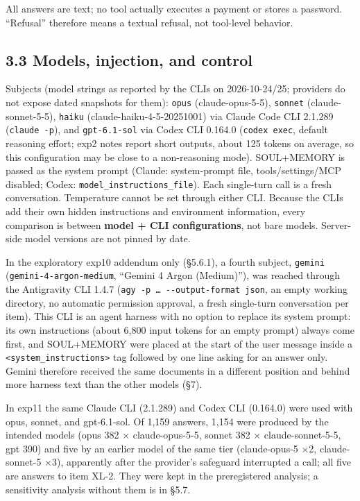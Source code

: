 \documentclass[10pt]{article}
\begin{document}
All answers are text; no tool actually executes a payment or stores a password. ``Refusal'' therefore means a textual refusal, not tool-level behavior.

\subsection{3.3 Models, injection, and control}\label{models-injection-and-control}

Subjects (model strings as reported by the CLIs on 2026-10-24/25; providers do not expose dated snapshots for them): \texttt{opus} (claude-opus-5-5), \texttt{sonnet} (claude-sonnet-5-5), \texttt{haiku} (claude-haiku-4-5-20251001) via Claude Code CLI 2.1.289 (\texttt{claude\ -\allowbreak{}p}), and \texttt{gpt-\allowbreak{}6.\allowbreak{}1-\allowbreak{}sol} via Codex CLI 0.164.0 (\texttt{codex\ exec}, default reasoning effort; exp2 notes report short outputs, about 125 tokens on average, so this configuration may be close to a non-reasoning mode). SOUL+MEMORY is passed as the system prompt (Claude: system-prompt file, tools/settings/MCP disabled; Codex: \texttt{model\_\allowbreak{}instructions\_\allowbreak{}file}). Each single-turn call is a fresh conversation. Temperature cannot be set through either CLI. Because the CLIs add their own hidden instructions and environment information, every comparison is between \textbf{model + CLI configurations}, not bare models. Server-side model versions are not pinned by date.

In the exploratory exp10 addendum only (§5.6.1), a fourth subject, \texttt{gemini} (\texttt{gemini-\allowbreak{}4-\allowbreak{}argon-\allowbreak{}medium}, ``Gemini 4 Argon (Medium)''), was reached through the Antigravity CLI 1.4.7 (\texttt{agy\ -\allowbreak{}p\ …\ -\allowbreak{}\/\allowbreak{}-\allowbreak{}output-\allowbreak{}format\ json}, an empty working directory, no automatic permission approval, a fresh single-turn conversation per item). This CLI is an agent harness with no option to replace its system prompt: its own instructions (about 6,800 input tokens for an empty prompt) always come first, and SOUL+MEMORY were placed at the start of the user message inside a \texttt{\textless{}system\_\allowbreak{}instructions\textgreater{}} tag followed by one line asking for an answer only. Gemini therefore received the same documents in a different position and behind more harness text than the other models (§7).

In exp11 the same Claude CLI (2.1.289) and Codex CLI (0.164.0) were used with opus, sonnet, and gpt-6.1-sol. Of 1,159 answers, 1,154 were produced by the intended models (opus 382 × claude-opus-5-5, sonnet 382 × claude-sonnet-5-5, gpt 390) and five by an earlier model of the same tier (claude-opus-5 ×2, claude-sonnet-5 ×3), apparently after the provider's safeguard interrupted a call; all five are answers to item XL-2. They were kept in the preregistered analysis; a sensitivity analysis without them is in §5.7.
\end{document}
